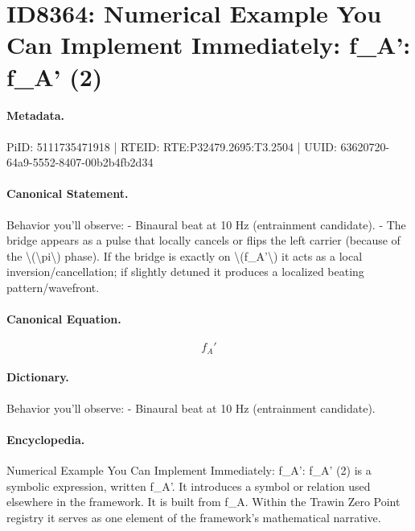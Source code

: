 \section*{ID8364: Numerical Example You Can Implement Immediately: f\_A': f\_A' (2)}
\paragraph{Metadata.}
PiID: 5111735471918 | RTEID: RTE:P32479.2695:T3.2504 | UUID: 63620720-64a9-5552-8407-00b2b4fb2d34

\paragraph{Canonical Statement.}
Behavior you’ll observe: - Binaural beat at 10 Hz (entrainment candidate). - The bridge appears as a pulse that locally cancels or flips the left carrier (because of the \textbackslash{}(\textbackslash{}pi\textbackslash{}) phase). If the bridge is exactly on \textbackslash{}(f\_A'\textbackslash{}) it acts as a local inversion/cancellation; if slightly detuned it produces a localized beating pattern/wavefront.

\paragraph{Canonical Equation.}
\[
f_A'
\]

\paragraph{Dictionary.}
Behavior you’ll observe: - Binaural beat at 10 Hz (entrainment candidate).

\paragraph{Encyclopedia.}
Numerical Example You Can Implement Immediately: f\_A': f\_A' (2) is a symbolic expression, written f\_A'. It introduces a symbol or relation used elsewhere in the framework. It is built from f\_A. Within the Trawin Zero Point registry it serves as one element of the framework's mathematical narrative.
